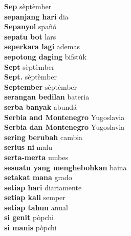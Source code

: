 \textbf{ Sep  } sèptèmber \\
\textbf{ sepanjang hari  } dia \\
\textbf{ Sepanyol  } spañó \\
\textbf{ sepatu bot  } lars \\
\textbf{ seperkara lagi  } ademas \\
\textbf{ sepotong daging  } bifstùk \\
\textbf{ Sept  } sèptèmber \\
\textbf{ Sept.  } sèptèmber \\
\textbf{ September  } sèptèmber \\
\textbf{ serangan bedilan  } bateria \\
\textbf{ serba banyak  } abundá \\
\textbf{ Serbia and Montenegro  } Yugoslavia \\
\textbf{ Serbia dan Montenegro  } Yugoslavia \\
\textbf{ sering berubah  } cambia \\
\textbf{ serius ni  } malu \\
\textbf{ serta-merta  } umbes \\
\textbf{ sesuatu yang menghebohkan  } baina \\
\textbf{ setakat mana  } grado \\
\textbf{ setiap hari  } diariamente \\
\textbf{ setiap kali  } semper \\
\textbf{ setiap tahun  } anual \\
\textbf{ si genit  } pòpchi \\
\textbf{ si manis  } pòpchi \\
